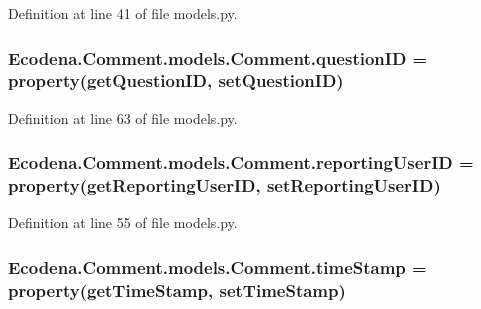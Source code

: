 Definition at line 41 of file models.py.

\hypertarget{class_ecodena_1_1_comment_1_1models_1_1_comment_ada022b7888e08bd7dc6f819260a73e57}{
\subsubsection[{questionID}]{\setlength{\rightskip}{0pt plus 5cm}Ecodena.Comment.models.Comment.questionID = property(getQuestionID, setQuestionID)}}
\label{d9/d86/class_ecodena_1_1_comment_1_1models_1_1_comment_ada022b7888e08bd7dc6f819260a73e57}


Definition at line 63 of file models.py.

\hypertarget{class_ecodena_1_1_comment_1_1models_1_1_comment_ad5f4e6f39bbbc54a135d3b6c29c0a2a2}{
\subsubsection[{reportingUserID}]{\setlength{\rightskip}{0pt plus 5cm}Ecodena.Comment.models.Comment.reportingUserID = property(getReportingUserID, setReportingUserID)}}
\label{d9/d86/class_ecodena_1_1_comment_1_1models_1_1_comment_ad5f4e6f39bbbc54a135d3b6c29c0a2a2}


Definition at line 55 of file models.py.

\hypertarget{class_ecodena_1_1_comment_1_1models_1_1_comment_af16a82189e30fcc76535a7306def5b6e}{
\subsubsection[{timeStamp}]{\setlength{\rightskip}{0pt plus 5cm}Ecodena.Comment.models.Comment.timeStamp = property(getTimeStamp, setTimeStamp)}}
\label{d9/d86/class_ecodena_1_1_comment_1_1models_1_1_comment_af16a82189e30fcc76535a7306def5b6e}


